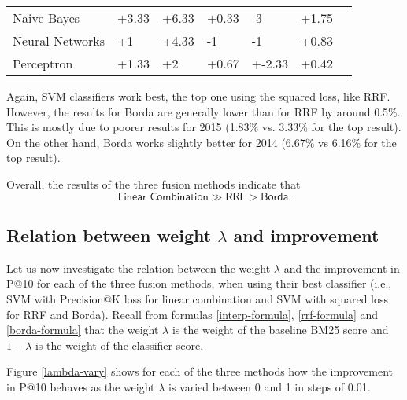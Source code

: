 \begin{table}[h!]
{\begin{tabular}{@{}lllllll@{}}
Naive Bayes                                              & +3.33           & +6.33              & +0.33           & -3                & +1.75          \\
Neural Networks                                         & +1              & +4.33              & -1             & -1                & +0.83          \\
Perceptron                                              & +1.33           & +2                 & +0.67           & +-2.33             & +0.42         \\\bottomrule
\end{tabular}%
}
\end{table}

Again, SVM classifiers work best, the top one using the squared loss, like RRF. 
However, the results for Borda are generally lower than for RRF by around 0.5\%. This is mostly due
to poorer results for 2015 (1.83\% vs. 3.33\% for the top result).
On the other hand, Borda works slightly better for 2014 (6.67\% vs 6.16\% for the top result).

Overall, the results of the three fusion methods indicate that \[\textsf{Linear Combination} \gg \textsf{RRF} > \textsf{Borda}.\]

\subsection{Relation between weight $\lambda$ and improvement}
Let us now investigate the relation between the weight $\lambda$ and the improvement in P@10 for each of the three
fusion methods, when using their best classifier (i.e., SVM with Precision@K loss for linear combination
and SVM with squared loss for RRF and Borda).
Recall from formulas \ref{interp-formula}, \ref{rrf-formula} and \ref{borda-formula} that the weight $\lambda$ is the 
weight of the baseline BM25 score and $1-\lambda$ is the weight of the classifier score.

Figure \ref{lambda-vary} shows for each of the three methods
how the improvement in P@10 behaves as the weight $\lambda$ is varied between 0 and 1 in steps of 0.01.

